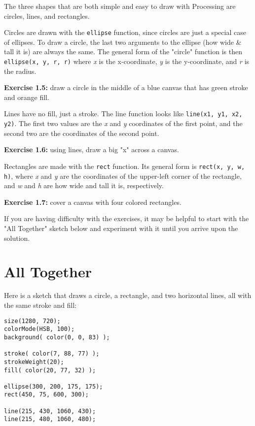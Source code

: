 \documentclass[
]{leaflet}
\begin{document}
The three shapes that are both simple and easy to draw with Processing are circles, lines, and rectangles.

Circles are drawn with the \texttt{ellipse} function, since circles are just a special case of ellipses.
To draw a circle, the last two arguments to the ellipse (how wide \& tall it is) are always the same.
The general form of the "circle" function is then \texttt{ellipse(x, y, r, r)} where \textit{x} is the x-coordinate, \textit{y} is the y-coordinate, and \textit{r} is the radius.

\textbf{Exercise 1.5:} draw a circle in the middle of a blue canvas that has green stroke and orange fill.

Lines have no fill, just a stroke.
The line function looks like \texttt{line(x1, y1, x2, y2)}.
The first two values are the \textit{x} and \textit{y} coordinates of the first point, and the second two are the coordinates of the second point.

\textbf{Exercise 1.6:} using lines, draw a big "x" across a canvas.

Rectangles are made with the \texttt{rect} function.
Its general form is \texttt{rect(x, y, w, h)}, where \textit{x} and \textit{y} are the coordinates of the upper-left corner of the rectangle, and \textit{w} and \textit{h} are how wide and tall it is, respectively.

\textbf{Exercise 1.7:} cover a canvas with four colored rectangles.

If you are having difficulty with the exercises, it may be helpful to start with the "All Together" sketch below and experiment with it until you arrive upon the solution.

\section{All Together}

Here is a sketch that draws a circle, a rectangle, and two horizontal lines, all with the same stroke and fill:

\begin{lstlisting}
size(1280, 720);
colorMode(HSB, 100);
background( color(0, 0, 83) );

stroke( color(7, 88, 77) );
strokeWeight(20);
fill( color(20, 77, 32) );

ellipse(300, 200, 175, 175);
rect(450, 75, 600, 300);

line(215, 430, 1060, 430);
line(215, 480, 1060, 480);
\end{lstlisting}
\end{document}
